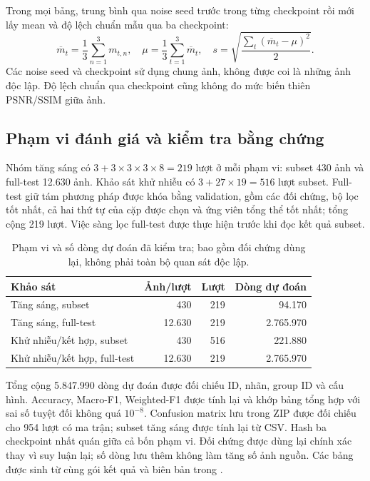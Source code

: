 Trong mọi bảng, trung bình qua noise seed trước trong từng checkpoint rồi mới lấy mean và độ lệch chuẩn mẫu qua ba checkpoint:
\begin{equation}
\overline m_t=\frac{1}{3}\sum_{n=1}^{3}m_{t,n},\quad
\mu=\frac{1}{3}\sum_{t=1}^{3}\overline m_t,\quad
s=\sqrt{\frac{\sum_t(\overline m_t-\mu)^2}{2}}.
\end{equation}
Các noise seed và checkpoint sử dụng chung ảnh, không được coi là những ảnh độc lập. Độ lệch chuẩn qua checkpoint cũng không đo mức biến thiên PSNR/SSIM giữa ảnh.

\subsection{Phạm vi đánh giá và kiểm tra bằng chứng}
Nhóm tăng sáng có $3+3\times3\times3\times8=219$ lượt ở mỗi phạm vi: subset 430 ảnh và full-test 12.630 ảnh. Khảo sát khử nhiễu có $3+27\times19=516$ lượt subset. Full-test giữ tám phương pháp được khóa bằng validation, gồm các đối chứng, bộ lọc tốt nhất, cả hai thứ tự của cặp được chọn và ứng viên tổng thể tốt nhất; tổng cộng 219 lượt. Việc sàng lọc full-test được thực hiện trước khi đọc kết quả subset.
\begin{table}[!htbp]\centering
\caption{Phạm vi và số dòng dự đoán đã kiểm tra; bao gồm đối chứng dùng lại, không phải toàn bộ quan sát độc lập.}
\begin{tabular}{lrrr}\toprule Khảo sát & Ảnh/lượt & Lượt & Dòng dự đoán\\\midrule
Tăng sáng, subset & 430 & 219 & 94.170\\
Tăng sáng, full-test & 12.630 & 219 & 2.765.970\\
Khử nhiễu/kết hợp, subset & 430 & 516 & 221.880\\
Khử nhiễu/kết hợp, full-test & 12.630 & 219 & 2.765.970\\\bottomrule
\end{tabular}\label{tab:coverage}\end{table}

Tổng cộng 5.847.990 dòng dự đoán được đối chiếu ID, nhãn, group ID và cấu hình. Accuracy, Macro-F1, Weighted-F1 được tính lại và khớp bảng tổng hợp với sai số tuyệt đối không quá $10^{-8}$. Confusion matrix lưu trong ZIP được đối chiếu cho 954 lượt có ma trận; subset tăng sáng được tính lại từ CSV. Hash ba checkpoint nhất quán giữa cả bốn phạm vi. Đối chứng được dùng lại chính xác thay vì suy luận lại; số dòng lưu thêm không làm tăng số ảnh nguồn. Các bảng được sinh từ cùng gói kết quả và biên bản trong .

